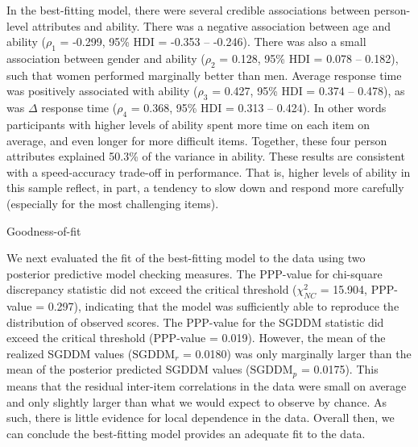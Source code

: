 \documentclass[a4paper,man,natbib]{apa6}
\makeatletter
\renewcommand{\subsubsection}{\@startsection{subsubsection}{3}
  {\z@}%
  {\b@level@two@skip}{\e@level@two@skip}%
  {\normalfont\normalsize\bfseries}}
\makeatother
\begin{document}
In the best-fitting model, there were several credible associations between person-level attributes and ability. There was a negative association between age and ability ($\rho_1$ = -0.299, 95\% HDI = -0.353 -- -0.246). There was also a small association between gender and ability ($\rho_2$ = 0.128, 95\% HDI = 0.078 -- 0.182), such that women performed marginally better than men. Average response time was positively associated with ability ($\rho_3$ = 0.427, 95\% HDI = 0.374 -- 0.478), as was $\Delta$ response time ($\rho_4$ = 0.368, 95\% HDI = 0.313 -- 0.424). In other words participants with higher levels of ability spent more time on each item on average, and even longer for more difficult items. Together, these four person attributes explained 50.3\% of the variance in ability. These results are consistent with a speed-accuracy trade-off in performance. That is, higher levels of ability in this sample reflect, in part, a tendency to slow down and respond more carefully (especially for the most challenging items).  

\subsubsection{Goodness-of-fit}

We next evaluated the fit of the best-fitting model to the data using two posterior predictive model checking measures. The PPP-value for chi-square discrepancy statistic did not exceed the critical threshold ($\chi^2_{NC}$ = 15.904, PPP-value = 0.297), indicating that the model was sufficiently able to reproduce the distribution of observed scores. The PPP-value for the SGDDM statistic did exceed the critical threshold (PPP-value = 0.019). However, the mean of the realized SGDDM values ($\text{SGDDM}_r$ = 0.0180) was only marginally larger than the mean of the posterior predicted SGDDM values ($\text{SGDDM}_p$ = 0.0175). This means that the residual inter-item correlations in the data were small on average and only slightly larger than what we would expect to observe by chance. As such, there is little evidence for local dependence in the data. Overall then, we can conclude the best-fitting model provides an adequate fit to the data.
\end{document}
